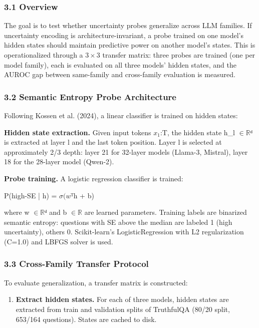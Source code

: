 
\subsubsection{3.1 Overview}

The goal is to test whether uncertainty probes generalize across LLM families. If uncertainty encoding is architecture-invariant, a probe trained on one model's hidden states should maintain predictive power on another model's states. This is operationalized through a $3\times 3$ transfer matrix: three probes are trained (one per model family), each is evaluated on all three models' hidden states, and the AUROC gap between same-family and cross-family evaluation is measured.

\subsubsection{3.2 Semantic Entropy Probe Architecture}

Following Kossen et al. (2024), a linear classifier is trained on hidden states:

\textbf{Hidden state extraction.} Given input tokens $x_1$:T, the hidden state h\_l $\in \mathbb{R}$ᵈ is extracted at layer l and the last token position. Layer l is selected at approximately 2/3 depth: layer 21 for 32-layer models (Llama-3, Mistral), layer 18 for the 28-layer model (Qwen-2).

\textbf{Probe training.} A logistic regression classifier is trained:

P(high-SE | h) = $\sigma (w$ᵀh + b)

where w $\in \mathbb{R}$ᵈ and b $\in \mathbb{R}$ are learned parameters. Training labels are binarized semantic entropy: questions with SE above the median are labeled 1 (high uncertainty), others 0. Scikit-learn's LogisticRegression with L2 regularization (C=1.0) and LBFGS solver is used.

\subsubsection{3.3 Cross-Family Transfer Protocol}

To evaluate generalization, a transfer matrix is constructed:

\begin{enumerate}
\item \textbf{Extract hidden states.} For each of three models, hidden states are extracted from train and validation splits of TruthfulQA (80/20 split, 653/164 questions). States are cached to disk.
\end{enumerate}

